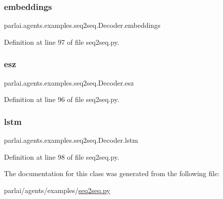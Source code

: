 \subsubsection{\texorpdfstring{embeddings}{embeddings}}
{\footnotesize\ttfamily parlai.\+agents.\+examples.\+seq2seq.\+Decoder.\+embeddings}



Definition at line 97 of file seq2seq.\+py.

\mbox{\label{classparlai_1_1agents_1_1examples_1_1seq2seq_1_1Decoder_a595779e6e60479d413ebe8ca7f643182}} 
\subsubsection{\texorpdfstring{esz}{esz}}
{\footnotesize\ttfamily parlai.\+agents.\+examples.\+seq2seq.\+Decoder.\+esz}



Definition at line 96 of file seq2seq.\+py.

\mbox{\label{classparlai_1_1agents_1_1examples_1_1seq2seq_1_1Decoder_a1a90e93b199377e14872451abfd67bd9}} 
\subsubsection{\texorpdfstring{lstm}{lstm}}
{\footnotesize\ttfamily parlai.\+agents.\+examples.\+seq2seq.\+Decoder.\+lstm}



Definition at line 98 of file seq2seq.\+py.



The documentation for this class was generated from the following file\+:\begin{DoxyCompactItemize}
\item 
parlai/agents/examples/\hyperlink{agents_2examples_2seq2seq_8py}{seq2seq.\+py}\end{DoxyCompactItemize}
